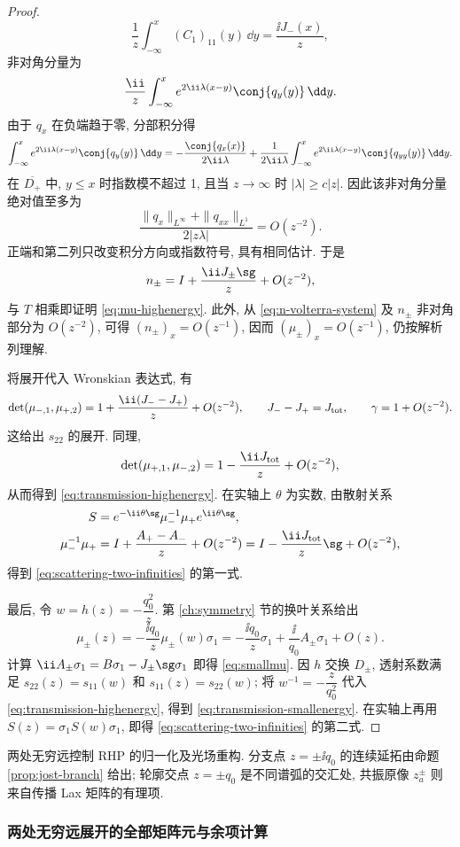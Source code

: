 \begin{proof}
\[
\dfrac{1}{z}\int_{-\infty}^{x}( C_1)_{11}(y)\,\dd y
=\dfrac{\ii J_-(x)}{z},
\]
非对角分量为
\[
\dfrac{\ii}{z}\int_{-\infty}^{x}e^{2\ii\lambda(x-y)}\conj{q_y(y)}\,\dd y.
\]
由于 $q_x$ 在负端趋于零, 分部积分得
\[
\int_{-\infty}^{x}e^{2\ii\lambda(x-y)}\conj{q_y(y)}\,\dd y
=-\dfrac{\conj{q_x(x)}}{2\ii\lambda}
+\dfrac{1}{2\ii\lambda}\int_{-\infty}^{x}e^{2\ii\lambda(x-y)}\conj{q_{yy}(y)}\,\dd y.
\]
在 $\overline{D_+}$ 中, $y\le x$ 时指数模不超过 1, 且当 $z\to\infty$ 时 $|\lambda|\ge c|z|$. 因此该非对角分量绝对值至多为
\[
\dfrac{\|q_x\|_{L^\infty}+\|q_{xx}\|_{L^1}}{2|z\lambda|}=O(z^{-2}).
\]
正端和第二列只改变积分方向或指数符号, 具有相同估计. 于是
\[
n_\pm=I+\dfrac{\ii J_\pm\sg}{z}+O(z^{-2}),
\]
与 $ T$ 相乘即证明 \eqref{eq:mu-highenergy}. 此外, 从 \eqref{eq:n-volterra-system} 及 $n_\pm$ 非对角部分为 $O(z^{-2})$, 可得 $(n_\pm)_x=O(z^{-1})$, 因而 $(\mu_\pm)_x=O(z^{-1})$, 仍按解析列理解.

将展开代入 Wronskian 表达式, 有
\[
\det(\mu_{-,1},\mu_{+,2})
=1+\dfrac{\ii(J_--J_+)}{z}+O(z^{-2}),\qquad
J_--J_+=J_{\rm tot},\qquad \gamma=1+O(z^{-2}).
\]
这给出 $s_{22}$ 的展开. 同理,
\[
\det(\mu_{+,1},\mu_{-,2})
=1-\dfrac{\ii J_{\rm tot}}{z}+O(z^{-2}),
\]
从而得到 \eqref{eq:transmission-highenergy}. 在实轴上 $\theta$ 为实数, 由散射关系
\[
\begin{aligned}
S&=e^{-\ii\theta\sg}\mu_-^{-1}\mu_+e^{\ii\theta\sg},\\
\mu_-^{-1}\mu_+&=I+\dfrac{A_+-A_-}{z}+O(z^{-2})
=I-\dfrac{\ii J_{\rm tot}}{z}\sg+O(z^{-2}),
\end{aligned}
\]
得到 \eqref{eq:scattering-two-infinities} 的第一式.

最后, 令 $w=h(z)=-\dfrac{q_0^2}{z}$. 第 \ref{ch:symmetry} 节的换叶关系给出
\[
\mu_\pm(z)=-\dfrac{\ii q_0}{z}\mu_\pm(w)\sigma_1
=-\dfrac{\ii q_0}{z}\sigma_1+\dfrac{\ii}{q_0}A_\pm\sigma_1+O(z).
\]
计算 $\ii A_\pm\sigma_1=B\sigma_1-J_\pm\sg\sigma_1$ 即得 \eqref{eq:smallmu}. 因 $h$ 交换 $D_\pm$, 透射系数满足 $s_{22}(z)=s_{11}(w)$ 和 $s_{11}(z)=s_{22}(w)$; 将 $w^{-1}=-\dfrac{z}{q_0^2}$ 代入 \eqref{eq:transmission-highenergy}, 得到 \eqref{eq:transmission-smallenergy}. 在实轴上再用 $S(z)=\sigma_1S(w)\sigma_1$, 即得 \eqref{eq:scattering-two-infinities} 的第二式.
\end{proof}

两处无穷远控制 RHP 的归一化及光场重构. 分支点 $z=\pm\ii q_0$ 的连续延拓由命题 \ref{prop:jost-branch} 给出; 轮廓交点 $z=\pm q_0$ 是不同谱弧的交汇处, 共振原像 $z_a^\pm$ 则来自传播 Lax 矩阵的有理项.


\subsubsection*{两处无穷远展开的全部矩阵元与余项计算}
